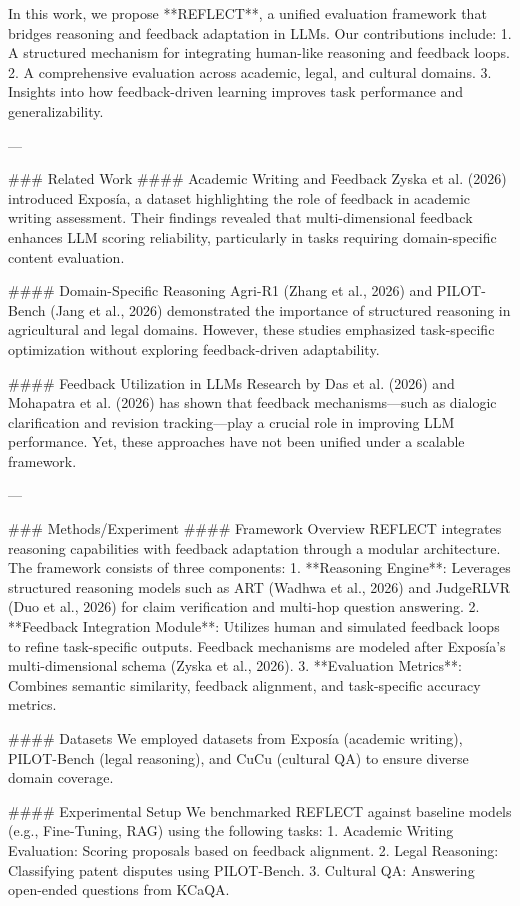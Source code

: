In this work, we propose **REFLECT**, a unified evaluation framework that bridges reasoning and feedback adaptation in LLMs. Our contributions include:  
1. A structured mechanism for integrating human-like reasoning and feedback loops.  
2. A comprehensive evaluation across academic, legal, and cultural domains.  
3. Insights into how feedback-driven learning improves task performance and generalizability.  

---

### Related Work  
#### Academic Writing and Feedback  
Zyska et al. (2026) introduced Exposía, a dataset highlighting the role of feedback in academic writing assessment. Their findings revealed that multi-dimensional feedback enhances LLM scoring reliability, particularly in tasks requiring domain-specific content evaluation.  

#### Domain-Specific Reasoning  
Agri-R1 (Zhang et al., 2026) and PILOT-Bench (Jang et al., 2026) demonstrated the importance of structured reasoning in agricultural and legal domains. However, these studies emphasized task-specific optimization without exploring feedback-driven adaptability.  

#### Feedback Utilization in LLMs  
Research by Das et al. (2026) and Mohapatra et al. (2026) has shown that feedback mechanisms—such as dialogic clarification and revision tracking—play a crucial role in improving LLM performance. Yet, these approaches have not been unified under a scalable framework.  

---

### Methods/Experiment  
#### Framework Overview  
REFLECT integrates reasoning capabilities with feedback adaptation through a modular architecture. The framework consists of three components:  
1. **Reasoning Engine**: Leverages structured reasoning models such as ART (Wadhwa et al., 2026) and JudgeRLVR (Duo et al., 2026) for claim verification and multi-hop question answering.  
2. **Feedback Integration Module**: Utilizes human and simulated feedback loops to refine task-specific outputs. Feedback mechanisms are modeled after Exposía’s multi-dimensional schema (Zyska et al., 2026).  
3. **Evaluation Metrics**: Combines semantic similarity, feedback alignment, and task-specific accuracy metrics.  

#### Datasets  
We employed datasets from Exposía (academic writing), PILOT-Bench (legal reasoning), and CuCu (cultural QA) to ensure diverse domain coverage.  

#### Experimental Setup  
We benchmarked REFLECT against baseline models (e.g., Fine-Tuning, RAG) using the following tasks:  
1. Academic Writing Evaluation: Scoring proposals based on feedback alignment.  
2. Legal Reasoning: Classifying patent disputes using PILOT-Bench.  
3. Cultural QA: Answering open-ended questions from KCaQA.  

